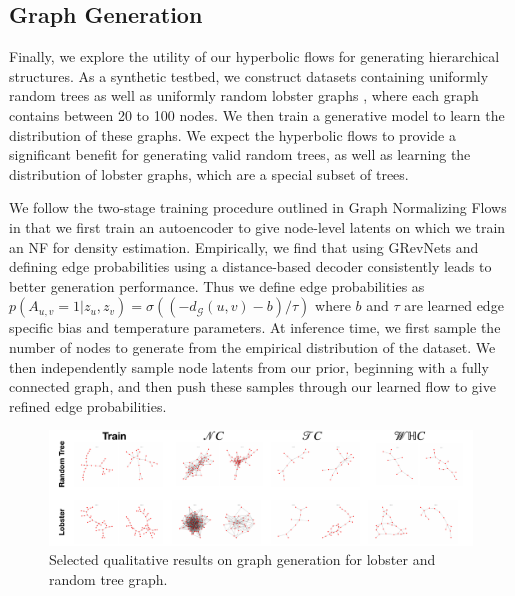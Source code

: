 \subsection{Graph Generation}

Finally, we explore the utility of our hyperbolic flows for generating hierarchical structures. 
As a synthetic testbed, we construct datasets containing uniformly random trees as well as uniformly random lobster graphs \cite{golomb1996polyominoes}, where each graph contains between 20 to 100 nodes. 
We then train a generative model to learn the distribution of these graphs. 
We expect the hyperbolic flows to provide a significant benefit for generating valid random trees, as well as learning the distribution of lobster graphs, which are a special subset of trees. 

We follow the two-stage training procedure outlined in Graph Normalizing Flows \cite{liu2019graph} in that we first train an autoencoder to give node-level latents on which we train an NF for density estimation. Empirically, we find that using GRevNets \cite{liu2019graph} and defining edge probabilities using a distance-based decoder consistently leads to better generation performance. Thus we define edge probabilities as $p(A_{u,v}=1|z_u,z_v) = \sigma((-d_{\mathcal{G}}(u,v) - b)/\tau)$ where $b$ and $\tau$ are learned edge specific bias and temperature parameters. At inference time, we first sample the number of nodes to generate from the empirical distribution of the dataset. We then independently sample node latents from our prior, beginning with a fully connected graph, and then push these samples through our learned flow to give refined edge probabilities.

\begin{figure}
    \centering
    \includegraphics[width=\textwidth]{hyperbolic_graph_gen.pdf}
    \vspace{-5mm}
    \caption{Selected qualitative results on graph generation for lobster and random tree graph.}
    \label{fig:graph_generation_pic}
\end{figure}

